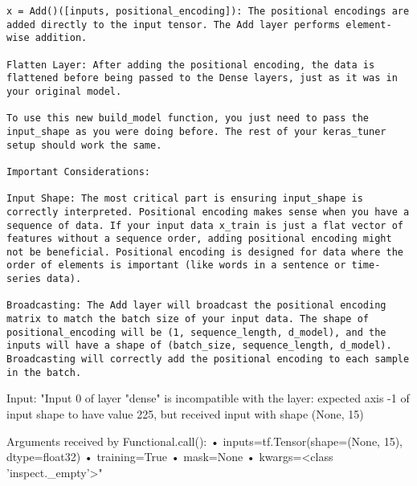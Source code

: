 \documentclass{article}
\begin{document}
\begin{verbatim}
x = Add()([inputs, positional_encoding]): The positional encodings are added directly to the input tensor. The Add layer performs element-wise addition.

Flatten Layer: After adding the positional encoding, the data is flattened before being passed to the Dense layers, just as it was in your original model.

To use this new build_model function, you just need to pass the input_shape as you were doing before. The rest of your keras_tuner setup should work the same.

Important Considerations:

Input Shape: The most critical part is ensuring input_shape is correctly interpreted. Positional encoding makes sense when you have a sequence of data. If your input data x_train is just a flat vector of features without a sequence order, adding positional encoding might not be beneficial. Positional encoding is designed for data where the order of elements is important (like words in a sentence or time-series data).

Broadcasting: The Add layer will broadcast the positional encoding matrix to match the batch size of your input data. The shape of positional_encoding will be (1, sequence_length, d_model), and the inputs will have a shape of (batch_size, sequence_length, d_model). Broadcasting will correctly add the positional encoding to each sample in the batch.
\end{verbatim}

Input: "Input 0 of layer "dense" is incompatible with the layer: expected axis -1 of input shape to have value 225, but received input with shape (None, 15)

Arguments received by Functional.call():
• inputs=tf.Tensor(shape=(None, 15), dtype=float32)
• training=True
• mask=None
• kwargs=<class 'inspect.\_empty'>"
\end{document}
